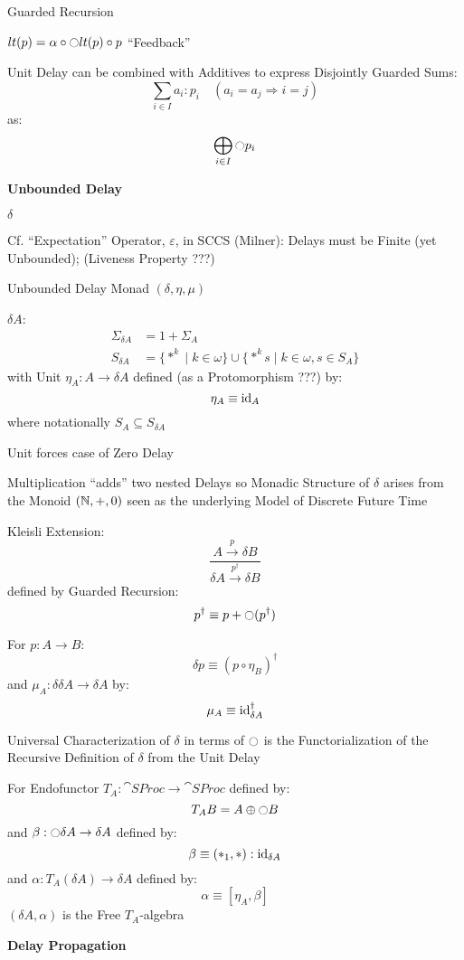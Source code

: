 Guarded Recursion

$lt(p) = \alpha \circ \ocircle lt(p) \circ p$ ``Feedback'' %

Unit Delay can be combined with Additives to express Disjointly
Guarded Sums:
\[
  \sum_{i \in I} a_i : p_i \quad (a_i = a_j \Rightarrow i = j)
\]
as:
\[
  \bigoplus_{i \in I} \ocircle p_i
\]


\textbf{Unbounded Delay}

$\delta$

\fist Cf. ``Expectation'' Operator, $\varepsilon$, in SCCS (Milner):
Delays must be Finite (yet Unbounded); (Liveness Property ???)

Unbounded Delay Monad $(\delta, \eta, \mu)$

$\delta A$:
\begin{align*}
  \Sigma_{\delta A} &= 1 + \Sigma_A \\
  S_{\delta A} &= \{*^k \mid k \in \omega\}
    \cup \{*^k s \mid k \in \omega, s \in S_A\}
\end{align*}
with Unit $\eta_A : A \rightarrow \delta A$ defined (as a
Protomorphism ???) by:
\[
  \eta_A \equiv \mathrm{id}_A
\]
where notationally $S_A \subseteq S_{\delta A}$

Unit forces case of Zero Delay

Multiplication ``adds'' two nested Delays so Monadic Structure of
$\delta$ arises from the Monoid $(\mathbb{N},+,0)$ seen as the underlying
Model of Discrete Future Time

Kleisli Extension:
\[
  \frac{A \xrightarrow{p} \delta B}
  {\delta A \xrightarrow{p^\dag} \delta B}
\]
defined by Guarded Recursion:
\[
  p^\dag \equiv p + \ocircle(p^\dag)
\]

For $p : A \rightarrow B$:
\[
  \delta p \equiv (p \circ \eta_B)^\dag
\]
and $\mu_A : \delta \delta A \rightarrow \delta A$ by:
\[
  \mu_A \equiv \mathrm{id}_{\delta A}^\dag
\]

Universal Characterization of $\delta$ in terms of $\ocircle$ is the
Functorialization of the Recursive Definition of $\delta$ from the
Unit Delay

For Endofunctor $T_A : \cat{SProc} \rightarrow \cat{SProc}$ defined
by:
\[
  T_A B = A \oplus \ocircle B
\]
and $\beta : \ocircle \delta A \rightarrow \delta A$ defined by:
\[
  \beta \equiv (*_1,*) : \mathrm{id}_{\delta A}
\]
and $\alpha : T_A(\delta A) \rightarrow \delta A$ defined by:
\[
  \alpha \equiv [\eta_A,\beta]
\]
$(\delta A, \alpha)$ is the Free $T_A$-algebra


\textbf{Delay Propagation}

